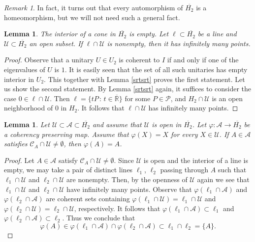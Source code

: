 \documentclass[10pt]{amsart}
\newtheorem{lemma}[theorem]{Lemma}
\theoremstyle{definition}
\theoremstyle{remark}
\newtheorem{remark}[theorem]{Remark}
\numberwithin{subsection}{section}
\numberwithin{equation}{section}
\newcommand\cP{{\mathcal{P}}}
\newcommand\oH{{\overline{H_2}}}
\newcommand\oR{{\overline{\mathbb{R}}}}
\begin{document}
\begin{remark}
In fact, it turns out that every automorphism of $\oH$ is a homeomorphism, but we will not need such a general fact.
\end{remark}

\begin{lemma}
The interior of a cone in $\oH$ is empty. 
Let $\ell\subset \oH$ be a line and $\mathcal{U}\subset \oH$ an open subset. 
If $\ell\cap \mathcal{U}$ is nonempty, then it has infinitely many points.  
\end{lemma}
\begin{proof}
Observe that a unitary $U\in U_2$ is coherent to $I$ if and only if one of the eigenvalues of $U$ is $1$. 
It is easily seen that the set of all such unitaries has empty interior in $U_2$. 
This together with Lemma \ref{srtsrt} proves the first statement.
Let us show the second statement. 
By Lemma \ref{srtsrt} again, it suffices to consider the case $0\in \ell\cap \mathcal{U}$. 
Then $\ell=\{tP\,:\, t\in \oR\}$ for some $P\in \cP$, and $H_2\cap \mathcal{U}$ is an open neighborhood of $0$ in $H_2$. It follows that $\ell\cap \mathcal{U}$ has infinitely many points.
\end{proof}


\begin{lemma}\label{ua}
Let $\mathcal{U}\subset \mathcal{A}\subset \oH$ and assume that $\mathcal{U}$ is open in $\oH$. 
Let $\varphi\colon \mathcal{A}\to \oH$ be a coherency preserving map. 
Assume that $\varphi(X)=X$ for every $X\in \mathcal{U}$. 
If $A\in \mathcal{A}$ satisfies $\mathcal{C}_A \cap \mathcal{U}\neq \emptyset$, then $\varphi(A)=A$. 
\end{lemma}
\begin{proof}
Let $A\in \mathcal{A}$ satisfy $\mathcal{C}_A \cap \mathcal{U}\neq \emptyset$.
Since $\mathcal{U}$ is open and the interior of a line is empty, we may take a pair of distinct lines $\ell_1$, $\ell_2$ passing through $A$ such that $\ell_1\cap \mathcal{U}$ and $\ell_2\cap \mathcal{U}$ are nonempty. 
Then, by the openness of $\mathcal{U}$ again we see that $\ell_1\cap \mathcal{U}$ and $\ell_2\cap \mathcal{U}$ have infinitely many points. 
Observe that $\varphi(\ell_1\cap \mathcal{A})$ and $\varphi(\ell_2\cap \mathcal{A})$ are coherent sets containing $\varphi(\ell_1\cap \mathcal{U})=\ell_1\cap \mathcal{U}$ and $\varphi(\ell_2\cap \mathcal{U})=\ell_2\cap \mathcal{U}$, respectively. 
It follows that $\varphi(\ell_1\cap \mathcal{A})\subset \ell_1$ and $\varphi(\ell_2\cap \mathcal{A})\subset \ell_2$. 
Thus we conclude that 
\[
\varphi(A)\in \varphi(\ell_1\cap \mathcal{A})\cap \varphi(\ell_2\cap \mathcal{A})\subset \ell_1\cap \ell_2=\{A\}.
\] 
\end{proof}
\end{document}
